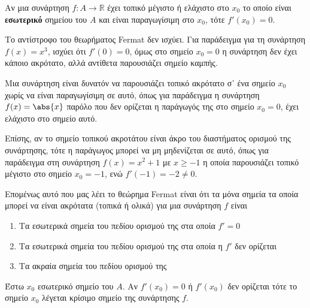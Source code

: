 \begin{thm}[Fermat]
  Αν μια συνάρτηση $ f \colon A \to \mathbb{R}$ έχει τοπικό μέγιστο ή ελάχιστο στο 
  $ x_{0} $ το οποίο είναι \textbf{εσωτερικό} σημείου του $A$ και είναι παραγωγίσιμη στο 
  $ x_{0} $, τότε $ f'(x_{0}) = 0 $.
\end{thm}

\begin{rem}
\item {}
  \begin{myitemize}
    \item Το αντίστροφο του θεωρήματος Fermat δεν ισχύει. Για παράδειγμα για τη 
      συνάρτηση $ f(x)=x^{3} $, ισχύει ότι $ f'(0)=0 $, όμως στο σημείο $ x_{0} = 0 $ η 
      συνάρτηση δεν έχει κάποιο ακρότατο, αλλά αντίθετα παρουσιάζει σημείο καμπής. 
    \item Μια συνάρτηση είναι δυνατόν να παρουσιάζει τοπικό ακρότατο σ᾽ ένα σημείο 
      $ x_{0} $ χωρίς να είναι παραγωγίσιμη σε αυτό, όπως για παράδειγμα η συνάρτηση 
      $ f(x) = \abs{x} $ παρόλο που δεν ορίζεται η παράγωγός της 
      στο σημείο $ x_{0} = 0 $, έχει ελάχιστο στο σημείο αυτό. 
    \item Επίσης, αν το σημείο τοπικού ακροτάτου είναι 
      άκρο του διαστήματος ορισμού της συνάρτησης, τότε η παράγωγος μπορεί να μη 
      μηδενίζεται σε αυτό, όπως για παράδειγμα στη συνάρτηση $ f(x)=x^{2}+1 $ με 
      $ x \geq -1 $ η οποία παρουσιάζει τοπικό μέγιστο στο σημείο $ x_{0}= -1 $, ενώ 
      $ f'(-1)=-2 \neq 0 $.
  \end{myitemize}
\end{rem}

\begin{rem}
  Επομένως αυτό που μας λέει το θεώρημα Fermat είναι ότι τα μόνα σημεία τα οποία
  μπορεί να είναι ακρότατα (τοπικά ή ολικά) για μια συνάρτηση $f$ είναι 

  \begin{enumerate}
    \item Τα εσωτερικά σημεία του πεδίου ορισμού της στα οποία $ f'=0 $
    \item Τα εσωτερικά σημεία του πεδίου ορισμού της στα οποία η $ f' $ δεν ορίζεται
    \item Τα ακραία σημεία του πεδίου ορισμού της
  \end{enumerate}
\end{rem}

\begin{dfn}
  Έστω $ x_{0} $ εσωτερικό σημείο του $A$. Αν $ f'(x_{0}) = 0 $ ή $ f'(x_{0}) $ 
  δεν ορίζεται τότε το σημείο $ x_{0} $ λέγεται \textcolor{Col1}{κρίσιμο} σημείο της 
  συνάρτησης $f$. 
\end{dfn}

